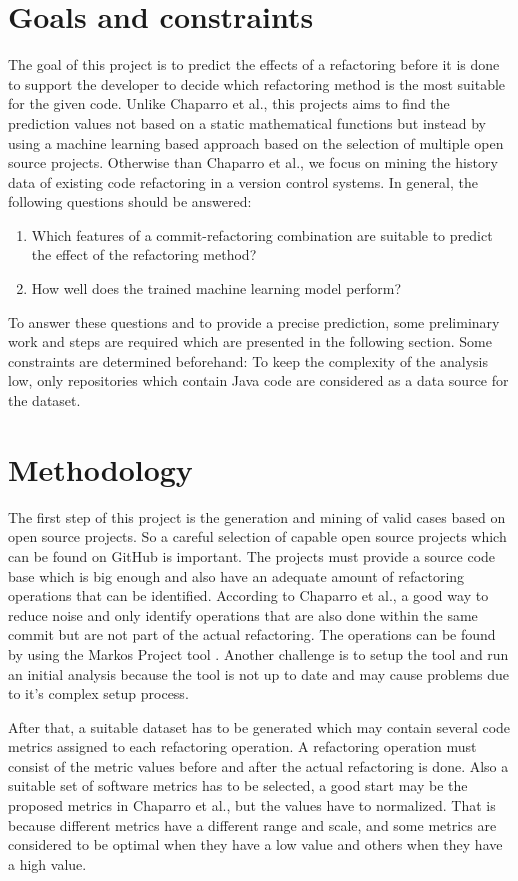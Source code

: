 \documentclass{article}
\begin{document}
\section{Goals and constraints}
The goal of this project is to predict the effects of a refactoring before it is done to support the developer to decide which refactoring method is the most suitable for the given code. Unlike Chaparro et al., this projects aims to find the prediction values not based on a static mathematical functions but instead by using a machine learning based approach based on the selection of multiple open source projects. Otherwise than Chaparro et al., we focus on mining the history data of existing code refactoring in a version control systems. In general, the following questions should be answered: 
\begin{enumerate}
    \item Which features of a commit-refactoring combination are suitable to predict the effect of the refactoring method?
    \item How well does the trained machine learning model perform?
\end{enumerate}
To answer these questions and to provide a precise prediction, some preliminary work and steps are required which are presented in the following section.
Some constraints are determined beforehand: To keep the complexity of the analysis low, only repositories which contain Java code are considered as a data source for the dataset.

\section{Methodology}
The first step of this project is the generation and mining of valid cases based on open source projects. So a careful selection of capable open source projects which can be found on GitHub is important. The projects must provide a source code base which is big enough and also have an adequate amount of refactoring operations that can be identified. According to Chaparro et al., a good way to reduce noise and only identify operations that are also done within the same commit but are not part of the actual refactoring. The operations can be found by using the Markos Project tool \cite{markosprojecthome}. Another challenge is to setup the tool and run an initial analysis because the tool is not up to date and may cause problems due to it’s complex setup process. 

After that, a suitable dataset has to be generated which may contain several code metrics assigned to each refactoring operation. A refactoring operation must consist of the metric values before and after the actual refactoring is done. Also a suitable set of software metrics has to be selected, a good start may be the proposed metrics in Chaparro et al., but the values have to normalized. That is because different metrics have a different range and scale, and some metrics are considered to be optimal when they have a low value and others when they have a high value.
\end{document}
